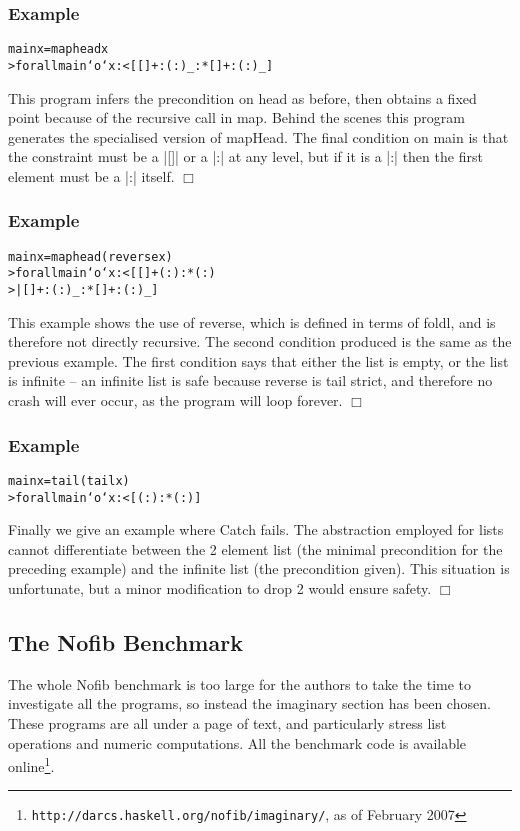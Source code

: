 \documentclass[preprint]{sigplanconf}
\newcommand{\C}[1]{\textsf{#1}}
\newcounter{exmp}
\newcommand{\yesexample}{\subsubsection*{Example \arabic{exmp}}\addtocounter{exmp}{1}}
\newcommand{\noexample}{\hfill$\Box$}
\newenvironment{code}{\begin{alltt}\small}{\end{alltt}}
\newenvironment{example}{\yesexample}{\noexample}
\begin{document}
\begin{example}
\begin{code}
main x = map head x
> forall main `o` x :< [ [] + : (:) _ :* [] + : (:) _ ]
\end{code}

This program infers the precondition on \C{head} as before, then obtains a fixed point because of the recursive call in \C{map}. Behind the scenes this program generates the specialised version of \C{mapHead}. The final condition on \C{main} is that the constraint must be a |[]| or a |:| at any level, but if it is a |:| then the first element must be a |:| itself.
\end{example}

\begin{example}
\begin{code}
main x = map head (reverse x)
> forall main `o` x :<  [  [] + (:) :* (:)
>                       |  [] + : (:) _ :* [] + : (:) _]
\end{code}

This example shows the use of \C{reverse}, which is defined in terms of \C{foldl}, and is therefore not directly recursive. The second condition produced is the same as the previous example. The first condition says that either the list is empty, or the list is infinite -- an infinite list is safe because \C{reverse} is tail strict, and therefore no crash will ever occur, as the program will loop forever.
\end{example}

\begin{example}
\begin{code}
main x = tail (tail x)
> forall main `o` x :< [ (:) :* (:) ]
\end{code}

Finally we give an example where Catch fails. The abstraction employed for lists cannot differentiate between the 2 element list (the minimal precondition for the preceding example) and the infinite list (the precondition given). This situation is unfortunate, but a minor modification to \C{drop 2} would ensure safety.
\end{example}

\subsection{The Nofib Benchmark}

The whole Nofib benchmark \citep{nofib} is too large for the authors to take the time to investigate all the programs, so instead the imaginary section has been chosen. These programs are all under a page of text, and particularly stress list operations and numeric computations. All the benchmark code is available online\footnote{\texttt{http://darcs.haskell.org/nofib/imaginary/}, as of February 2007}.
\end{document}
